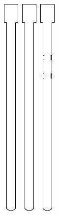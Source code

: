 \documentclass[openany]{book}
\begin{document}
\begin{figure}[!ht]
\begin{subfigure}{.4\textwidth}
		\includegraphics[width=.05\textwidth]{images/transmission-shaft.pdf}\,
		\includegraphics[width=.05\textwidth]{images/transmission-shaft.pdf}\,
		\includegraphics[width=.05\textwidth]{images/transmission-result-one.pdf}

\end{subfigure}
\end{figure}
\end{document}
